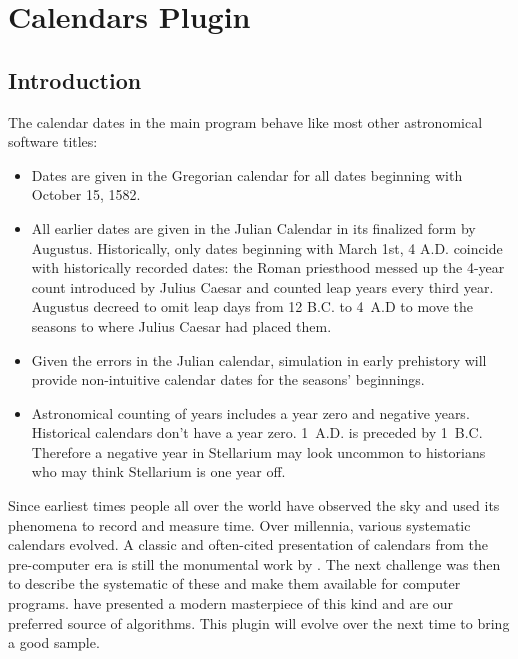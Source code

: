 

\newpage
\section{Calendars Plugin}
\label{sec:plugin:Calendars}



\subsection{Introduction}
\label{sec:plugin:Calendars:Introduction}

The calendar dates in the main program behave like most other astronomical software titles:

\begin{itemize}
\item Dates are given in the Gregorian calendar for all dates
  beginning with October 15, 1582.
\item All earlier dates are given in the Julian Calendar in its
  finalized form by Augustus. Historically, only dates beginning with
  March 1st, 4 A.D. coincide with historically recorded dates: the
  Roman priesthood messed up the 4-year count introduced by Julius
  Caesar and counted leap years every third year. Augustus decreed to
  omit leap days from 12 B.C. to 4~A.D to move the seasons to where
  Julius Caesar had placed them.
\item Given the errors in the Julian calendar, simulation in early
  prehistory will provide non-intuitive calendar dates for the
  seasons' beginnings.
\item Astronomical counting of years includes a year zero and negative
  years. Historical calendars don't have a year zero. 1~A.D. is
  preceded by 1~B.C. Therefore a negative year in Stellarium may look
  uncommon to historians who may think Stellarium is one year off.
\end{itemize}


Since earliest times people all over the world have observed the sky
and used its phenomena to record and measure time. Over millennia,
various systematic calendars evolved. A classic and often-cited
presentation of calendars from the pre-computer era is still the
monumental work by \citet{Ginzel:ChronologieI, Ginzel:ChronologieII,
  Ginzel:ChronologieIII}.  The next challenge was then to describe
the systematic of these and make them available for computer programs.
\citet{Reingold-Dershowitz:2018} have presented a modern masterpiece
of this kind and are our preferred source of algorithms. This plugin
 will evolve over the next time to bring a good
sample.


